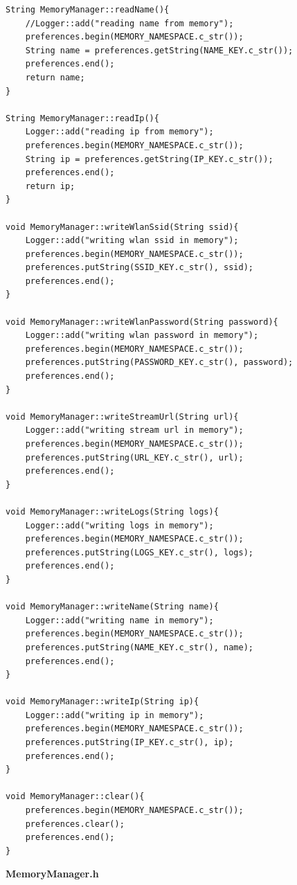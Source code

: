 \documentclass[11pt, twoside]{article}
\begin{document}
\begin{lstlisting}
String MemoryManager::readName(){
    //Logger::add("reading name from memory");
    preferences.begin(MEMORY_NAMESPACE.c_str());
    String name = preferences.getString(NAME_KEY.c_str());
    preferences.end();
    return name;
}

String MemoryManager::readIp(){
    Logger::add("reading ip from memory");
    preferences.begin(MEMORY_NAMESPACE.c_str());
    String ip = preferences.getString(IP_KEY.c_str());
    preferences.end();
    return ip;
}

void MemoryManager::writeWlanSsid(String ssid){
    Logger::add("writing wlan ssid in memory");
    preferences.begin(MEMORY_NAMESPACE.c_str());
    preferences.putString(SSID_KEY.c_str(), ssid);
    preferences.end();
}

void MemoryManager::writeWlanPassword(String password){
    Logger::add("writing wlan password in memory");
    preferences.begin(MEMORY_NAMESPACE.c_str());
    preferences.putString(PASSWORD_KEY.c_str(), password);
    preferences.end();
}

void MemoryManager::writeStreamUrl(String url){
    Logger::add("writing stream url in memory");
    preferences.begin(MEMORY_NAMESPACE.c_str());
    preferences.putString(URL_KEY.c_str(), url);
    preferences.end();
}

void MemoryManager::writeLogs(String logs){
    Logger::add("writing logs in memory");
    preferences.begin(MEMORY_NAMESPACE.c_str());
    preferences.putString(LOGS_KEY.c_str(), logs);
    preferences.end();
}

void MemoryManager::writeName(String name){
    Logger::add("writing name in memory");
    preferences.begin(MEMORY_NAMESPACE.c_str());
    preferences.putString(NAME_KEY.c_str(), name);
    preferences.end();
}

void MemoryManager::writeIp(String ip){
    Logger::add("writing ip in memory");
    preferences.begin(MEMORY_NAMESPACE.c_str());
    preferences.putString(IP_KEY.c_str(), ip);
    preferences.end();
}

void MemoryManager::clear(){
    preferences.begin(MEMORY_NAMESPACE.c_str());
    preferences.clear();
    preferences.end();
}\end{lstlisting}

\textbf{MemoryManager.h}
\end{document}
